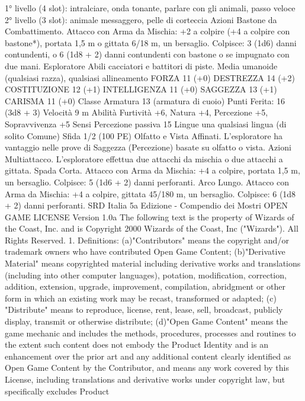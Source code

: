 \begin{multicols}{2}
1° livello (4 slot): intralciare, onda tonante, parlare con gli
animali, passo veloce
2° livello (3 slot): animale messaggero, pelle di corteccia
Azioni
Bastone da Combattimento. Attacco con Arma da Mischia: +2 a
colpire (+4 a colpire con bastone*), portata 1,5 m o gittata 6/18
m, un bersaglio.
Colpisce: 3 (1d6) danni contundenti, o 6 (1d8 + 2) danni
contundenti con bastone o se impugnato con due mani.
Esploratore
Abili cacciatori e battitori di piste.
Media umanoide (qualsiasi razza), qualsiasi allineamento
FORZA 11 (+0)
DESTREZZA 14 (+2)
COSTITUZIONE 12 (+1)
INTELLIGENZA 11 (+0)
SAGGEZZA 13 (+1)
CARISMA 11 (+0)
Classe Armatura 13 (armatura di cuoio)
\hspace*{0pt}\hfill{Punti Ferita}: 16 (3d8 + 3)
Velocità 9 m
Abilità Furtività +6, Natura +4, Percezione +5, Sopravvivenza
+5
Sensi Percezione passiva 15
Lingue una qualsiasi lingua (di solito Comune)
Sfida 1/2 (100 PE)
Olfatto e Vista Affinati. L’esploratore ha vantaggio nelle prove
di Saggezza (Percezione) basate su olfatto o vista.
Azioni
Multiattacco. L’esploratore effettua due attacchi da mischia o
due attacchi a gittata.
Spada Corta. Attacco con Arma da Mischia: +4 a colpire, portata
1,5 m, un bersaglio.
Colpisce: 5 (1d6 + 2) danni perforanti.
Arco Lungo. Attacco con Arma da Mischia: +4 a colpire, gittata
45/180 m, un bersaglio.
Colpisce: 6 (1d8 + 2) danni perforanti.
SRD Italia 5a Edizione - Compendio dei Mostri
OPEN GAME LICENSE Version 1.0a
The following text is the property of Wizards of
the Coast, Inc. and is Copyright 2000 Wizards of
the Coast, Inc ("Wizards"). All Rights Reserved.
1. Definitions: (a)"Contributors" means the
copyright and/or trademark owners who have
contributed Open Game Content; (b)"Derivative
Material" means copyrighted material including
derivative works and translations (including into
other computer languages), potation,
modification, correction, addition, extension,
upgrade, improvement, compilation, abridgment
or other form in which an existing work may be
recast, transformed or adapted; (c) "Distribute"
means to reproduce, license, rent, lease, sell,
broadcast, publicly display, transmit or otherwise
distribute; (d)"Open Game Content" means the
game mechanic and includes the methods,
procedures, processes and routines to the extent
such content does not embody the Product
Identity and is an enhancement over the prior art
and any additional content clearly identified as
Open Game Content by the Contributor, and
means any work covered by this License,
including translations and derivative works under
copyright law, but specifically excludes Product

\end{multicols}
